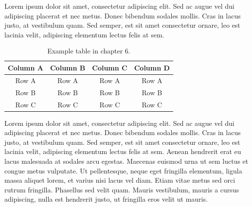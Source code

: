 Lorem ipsum dolor sit amet, consectetur adipiscing elit. Sed ac augue vel dui 
adipiscing placerat et nec metus. Donec bibendum sodales mollis. Cras in lacus 
justo, at vestibulum quam. Sed semper, est sit amet consectetur ornare, leo est 
lacinia velit, adipiscing elementum lectus felis at sem.

\begin{table}
{\setlength{\tabcolsep}{14pt}
\caption{Example table in chapter 6.}
\begin{center}
\vspace{-6mm}
\begin{tabular}{cccc}
\hline\hline
Column A & Column B & Column C & Column D \\
\hline
Row A & Row A & Row A & Row A \\
Row B & Row B & Row B & Row B \\
Row C & Row C & Row C & Row C \\
\hline
\end{tabular}
\vspace{-6mm}
\end{center}
\label{tableforCh6-1}}
\end{table}

Lorem ipsum dolor sit amet, consectetur adipiscing elit. Sed ac augue vel dui 
adipiscing placerat et nec metus. Donec bibendum sodales mollis. Cras in lacus 
justo, at vestibulum quam. Sed semper, est sit amet consectetur ornare, leo est 
lacinia velit, adipiscing elementum lectus felis at sem. Aenean hendrerit erat eu 
lacus malesuada at sodales arcu egestas. Maecenas euismod urna ut sem luctus et 
congue metus vulputate. Ut pellentesque, neque eget fringilla elementum, ligula 
massa aliquet lorem, et varius nisi lacus vel diam. Etiam vitae metus sed orci 
rutrum fringilla. Phasellus sed velit quam. Mauris vestibulum, mauris a cursus 
adipiscing, nulla est hendrerit justo, ut fringilla eros velit ut mauris.